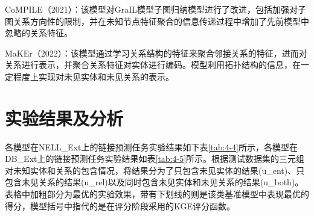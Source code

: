 CoMPILE\cite{mai2021communicative}（2021）：该模型对GraIL模型子图归纳模型进行了改进，包括加强对子图关系方向性的限制，并在未知节点特征聚合的信息传递过程中增加了先前模型中忽略的关系特征。

MaKEr\cite{chen2019meta}（2022）：该模型通过学习关系结构的特征来聚合邻接关系的特征，进而对关系进行表示，并聚合关系特征对实体进行编码。模型利用拓扑结构的信息，在一定程度上实现对未见实体和未见关系的表示。

\section{实验结果及分析}
各模型在NELL\_Ext上的链接预测任务实验结果如下表\ref{tab:4-4}所示，各模型在DB\_Ext上的链接预测任务实验结果如表\ref{tab:4-5}所示。根据测试数据集的三元组对未知实体和关系的包含情况，将结果分为了只包含未见实体的结果(u\_ent)、只包含未见关系的结果(u\_rel)以及同时包含未见实体和未见关系的结果(u\_both)。表格中加粗部分为最优的实验效果，带有下划线的则是该类基准模型中表现最优的得分，模型括号中指代的是在评分阶段采用的KGE评分函数。
